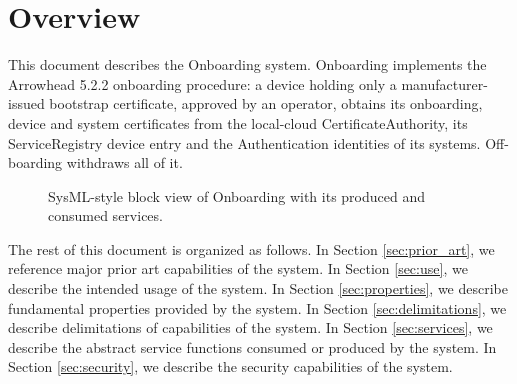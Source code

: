 \documentclass[a4paper]{arrowhead}
\begin{document}
\section{Overview}
\label{sec:overview}

This document describes the Onboarding system. Onboarding implements the Arrowhead 5.2.2 onboarding procedure: a device holding only a manufacturer-issued bootstrap certificate, approved by an operator, obtains its onboarding, device and system certificates from the local-cloud Certificate\allowbreak{}Authority, its ServiceRegistry device entry and the Authentication identities of its systems. Off-boarding withdraws all of it.

\begin{figure}[ht!]
  \centering
  \caption{SysML-style block view of Onboarding with its produced and consumed services.}
  \label{fig:system}
\end{figure}

The rest of this document is organized as follows.
In Section \ref{sec:prior_art}, we reference major prior art capabilities of the system.
In Section \ref{sec:use}, we describe the intended usage of the system.
In Section \ref{sec:properties}, we describe fundamental properties provided by the system.
In Section \ref{sec:delimitations}, we describe delimitations of capabilities of the system.
In Section \ref{sec:services}, we describe the abstract service functions consumed or produced by the system.
In Section \ref{sec:security}, we describe the security capabilities of the system.
\end{document}
